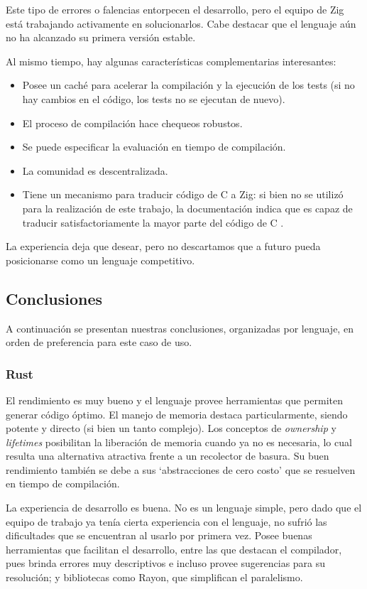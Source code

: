 \documentclass[11pt]{article}
\let\Oldsubsection\subsection
\renewcommand{\subsection}{\FloatBarrier\Oldsubsection}
\let\Oldsubsubsection\subsubsection
\renewcommand{\subsubsection}{\FloatBarrier\Oldsubsubsection}
\newcommand{\english}[1]{\textit{#1}}
\begin{document}
Este tipo de errores o falencias entorpecen el desarrollo, pero el equipo de Zig está trabajando activamente en solucionarlos. Cabe destacar que el lenguaje aún no ha alcanzado su primera versión estable.

Al mismo tiempo, hay algunas características complementarias interesantes:
\begin{itemize}
    \item Posee un caché para acelerar la compilación y la ejecución de los tests (si no hay cambios en el código, los tests no se ejecutan de nuevo).
    \item El proceso de compilación hace chequeos robustos.
    \item Se puede especificar la evaluación en tiempo de compilación.
    \item La comunidad es descentralizada.
    \item Tiene un mecanismo para traducir código de C a Zig: si bien no se utilizó para la realización de este trabajo, la documentación indica que es capaz de traducir satisfactoriamente la mayor parte del código de C \cite{aes:zig:translate_c}.
\end{itemize}

La experiencia deja que desear, pero no descartamos que a futuro pueda posicionarse como un lenguaje competitivo.

\subsection{Conclusiones}

A continuación se presentan nuestras conclusiones, organizadas por lenguaje, en orden de preferencia para este caso de uso.

\subsubsection{Rust}

El rendimiento es muy bueno y el lenguaje provee herramientas que permiten generar código óptimo. El manejo de memoria destaca particularmente, siendo potente y directo (si bien un tanto complejo). Los conceptos de \english{ownership} y \english{lifetimes} posibilitan la liberación de memoria cuando ya no es necesaria, lo cual resulta una alternativa atractiva frente a un recolector de basura. Su buen rendimiento también se debe a sus `abstracciones de cero costo' que se resuelven en tiempo de compilación.

La experiencia de desarrollo es buena. No es un lenguaje simple, pero dado que el equipo de trabajo ya tenía cierta experiencia con el lenguaje, no sufrió las dificultades que se encuentran al usarlo por primera vez. Posee buenas herramientas que facilitan el desarrollo, entre las que destacan el compilador, pues brinda errores muy descriptivos e incluso provee sugerencias para su resolución; y bibliotecas como Rayon, que simplifican el paralelismo.
\end{document}
